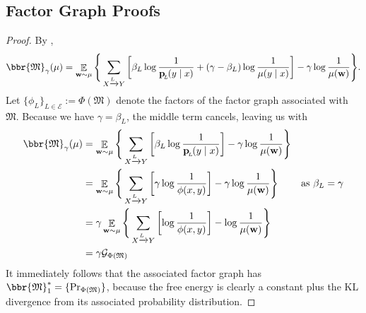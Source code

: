 \documentclass{article}
\theoremstyle{plain}
\theoremstyle{definition}
\theoremstyle{remark}
\DeclareMathOperator*{\E}{\mathbb{E}} %
\newcommand\mat[1]{\mathbf{#1}}
\newcommand{\bp}[1][L]{\mat{p}_{\!_{#1}\!}}
\newcommand{\Ed}{\mathcal E}
\newcommand{\dg}[1]{\mathfrak{#1}}
\numberwithin{equation}{section}
\begin{document}
	\subsection{Factor Graph Proofs}
	\thmpdgisfg*
	\begin{proof}
		By ,
		\[ \bbr{\dg M}_\gamma(\mu)= \E_{\mat w \sim \mu} \Bigg\{   \sum_{ X \xrightarrow{\!\!L} Y  } \left[
			\beta_L \log \frac{1}{\bp(y\mid x)} + (\gamma - \beta_L ) \log \frac{1}{\mu(y \mid x)} \right] - \gamma \log \frac{1}{\mu(\mat w)} \Bigg\}.  \]
		Let $\{\phi_L\}_{L \in \Ed} := \Phi(\dg M)$ denote the factors of the factor graph associated with $\dg M$.
		Because we have $\gamma  = \beta_L$, the middle term cancels, leaving us with
 		\begin{align*}
		\bbr{\dg M}_\gamma(\mu) &= \E_{\mat w \sim \mu} \Bigg\{   \sum_{ X \xrightarrow{\!\!L} Y  } \left[
			\beta_L \log \frac{1}{\bp(y\mid x)} \right] - \gamma \log \frac{1}{\mu(\mat w)} \Bigg\} \\
			&= \E_{\mat w \sim \mu} \Bigg\{   \sum_{ X \xrightarrow{\!\!L} Y  } \left[
				\gamma \log \frac{1}{\phi(x,y)}  \right] - \gamma \log \frac{1}{\mu(\mat w)} \Bigg\} 
					&\text{as $\beta_L = \gamma$}\\
			&= \gamma \E_{\mat w \sim \mu} \Bigg\{   \sum_{ X \xrightarrow{\!\!L} Y  } \left[
				\log \frac{1}{\phi(x,y)}  \right] -\log \frac{1}{\mu(\mat w)} \Bigg\} \\
			&= \gamma \mathcal G_{\Phi(\dg M)}
 		\end{align*}
		It immediately follows that the associated factor graph has $\bbr{\dg M}^*_1 = \{\Pr_{\Phi(\dg M)}\}$, because the free energy is clearly a constant plus the KL divergence from its associated probability distribution.
	\end{proof}
	\thmfgispdg*
\end{document}
